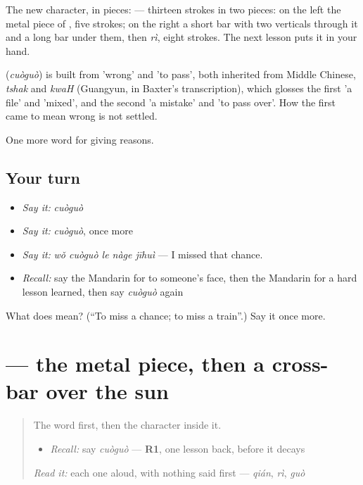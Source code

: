 The new character, in pieces:  — thirteen strokes in two pieces: on the left the metal piece of , five strokes; on the right a short bar with two verticals through it and a long bar under them, then  \emph{rì}, eight strokes. The next lesson puts it in your hand.

\begin{cousinweb}
\textbf{} (\emph{cuòguò}) is built from  'wrong' and  'to pass', both inherited from Middle Chinese, \emph{tshak} and \emph{kwaH} (Guangyun, in Baxter's transcription), which glosses the first 'a file' and 'mixed', and the second 'a mistake' and 'to pass over'. How the first came to mean wrong is not settled.
\end{cousinweb}

\begin{grammarlens}[title={What you've built}]
One more word for giving reasons.
\end{grammarlens}

\subsection*{Your turn}
\begin{itemize}
\raggedright
  \item \emph{Say it:} \emph{cuòguò}
  \item \emph{Say it:} \emph{cuòguò}, once more
  \item \emph{Say it:} \emph{wǒ cuòguò le nàge jīhuì} — I missed that chance.
  \item \emph{Recall:} say the Mandarin for to someone's face, then the Mandarin for a hard lesson learned, then say \emph{cuòguò} again
\end{itemize}

\begin{tcolorbox}[breakable,colback=teal!4,colframe=teal!35!black,title={Before you move on}]
What does  mean? (\textquotedblleft{}To miss a chance; to miss a train\textquotedblright{}.) Say it once more.
\end{tcolorbox}
\section[\texorpdfstring{\zh{错} (cuò)}{错 (cuò)}]{ — the metal piece, then a cross-bar over the sun}

\label{lesson:ZH-W356-cuo-wrong}



\begin{quote}
The word first, then the character inside it.

\begin{itemize}
\raggedright
  \item \emph{Recall:} say \emph{cuòguò} — \textbf{R1}, one lesson back, before it decays
\end{itemize}

\begin{quote}
  
\end{quote}

\emph{Read it:} each one aloud, with nothing said first — \emph{qián}, \emph{rì}, \emph{guò}
\end{quote}

